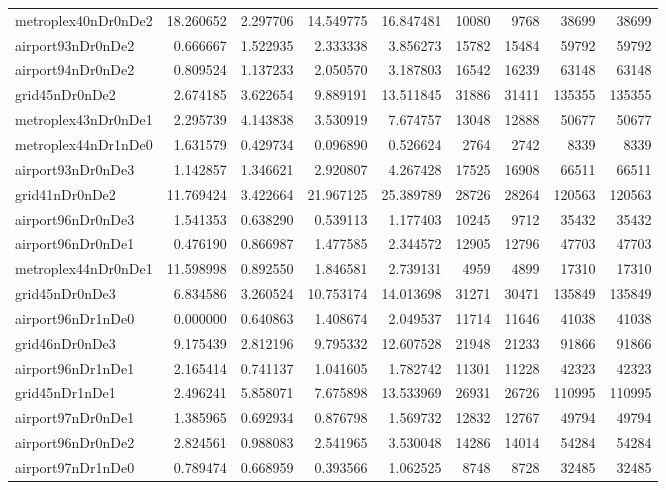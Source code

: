 \begin{longtable}{|l|r|r|r|r|r|r|r|r|}
metroplex40nDr0nDe2 & 18.260652 & 2.297706 & 14.549775 & 16.847481 & 10080 & 9768 & 38699 & 38699 \\
airport93nDr0nDe2 & 0.666667 & 1.522935 & 2.333338 & 3.856273 & 15782 & 15484 & 59792 & 59792 \\
airport94nDr0nDe2 & 0.809524 & 1.137233 & 2.050570 & 3.187803 & 16542 & 16239 & 63148 & 63148 \\
grid45nDr0nDe2 & 2.674185 & 3.622654 & 9.889191 & 13.511845 & 31886 & 31411 & 135355 & 135355 \\
metroplex43nDr0nDe1 & 2.295739 & 4.143838 & 3.530919 & 7.674757 & 13048 & 12888 & 50677 & 50677 \\
metroplex44nDr1nDe0 & 1.631579 & 0.429734 & 0.096890 & 0.526624 & 2764 & 2742 & 8339 & 8339 \\
airport93nDr0nDe3 & 1.142857 & 1.346621 & 2.920807 & 4.267428 & 17525 & 16908 & 66511 & 66511 \\
grid41nDr0nDe2 & 11.769424 & 3.422664 & 21.967125 & 25.389789 & 28726 & 28264 & 120563 & 120563 \\
airport96nDr0nDe3 & 1.541353 & 0.638290 & 0.539113 & 1.177403 & 10245 & 9712 & 35432 & 35432 \\
airport96nDr0nDe1 & 0.476190 & 0.866987 & 1.477585 & 2.344572 & 12905 & 12796 & 47703 & 47703 \\
metroplex44nDr0nDe1 & 11.598998 & 0.892550 & 1.846581 & 2.739131 & 4959 & 4899 & 17310 & 17310 \\
grid45nDr0nDe3 & 6.834586 & 3.260524 & 10.753174 & 14.013698 & 31271 & 30471 & 135849 & 135849 \\
airport96nDr1nDe0 & 0.000000 & 0.640863 & 1.408674 & 2.049537 & 11714 & 11646 & 41038 & 41038 \\
grid46nDr0nDe3 & 9.175439 & 2.812196 & 9.795332 & 12.607528 & 21948 & 21233 & 91866 & 91866 \\
airport96nDr1nDe1 & 2.165414 & 0.741137 & 1.041605 & 1.782742 & 11301 & 11228 & 42323 & 42323 \\
grid45nDr1nDe1 & 2.496241 & 5.858071 & 7.675898 & 13.533969 & 26931 & 26726 & 110995 & 110995 \\
airport97nDr0nDe1 & 1.385965 & 0.692934 & 0.876798 & 1.569732 & 12832 & 12767 & 49794 & 49794 \\
airport96nDr0nDe2 & 2.824561 & 0.988083 & 2.541965 & 3.530048 & 14286 & 14014 & 54284 & 54284 \\
airport97nDr1nDe0 & 0.789474 & 0.668959 & 0.393566 & 1.062525 & 8748 & 8728 & 32485 & 32485 \\

\end{longtable}
